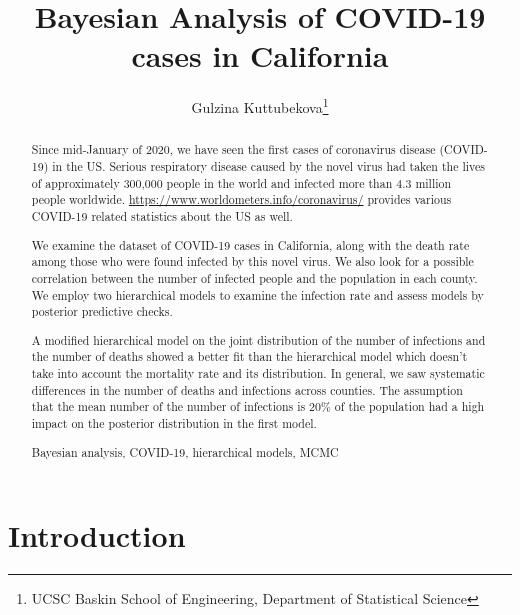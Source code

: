 \documentclass[11pt,twocolumn]{asaproc}
\title{Bayesian Analysis of COVID-19 cases in California}
\author{Gulzina Kuttubekova\thanks{UCSC Baskin School of Engineering, Department of Statistical Science}}
\begin{document}
\maketitle





\begin{abstract}
 Since mid-January of 2020, we have seen the first cases of coronavirus disease (COVID-19) in the US. Serious respiratory disease caused by the novel virus had taken the lives of approximately 300,000 people in the world and infected more than 4.3 million people worldwide. \url{https://www.worldometers.info/coronavirus/} provides various COVID-19 related statistics about the US as well.

We examine the dataset of COVID-19 cases in California, along with the death rate among those who were found infected by this novel virus. We also look for a possible correlation between the number of infected people and the population in each county. We employ two hierarchical models to examine the infection rate and assess models by posterior predictive checks. 

A modified hierarchical model on the joint distribution of the number of infections and the number of deaths showed a better fit than the hierarchical model which doesn't take into account the mortality rate and its distribution. In general, we saw systematic differences in the number of deaths and infections across counties. The assumption that the mean number of the number of infections is 20\% of the population had a high impact on the posterior distribution in the first model.


\begin{keywords}
Bayesian analysis, COVID-19, hierarchical models, MCMC
\end{keywords}
\end{abstract}







\section{Introduction\label{Introduction}}
\end{document}

